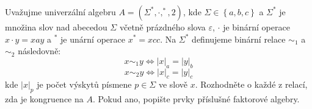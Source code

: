 \subsubsection{}
Uvažujme univerzální algebru $A=\left ( \Sigma^{*},\cdot ,^{*},2 \right )$, kde
$\Sigma \in \left \{ a,b,c \right \}$ a $\Sigma^{*}$ je množina slov nad
abecedou $\Sigma$ včetně prázdného slova $\varepsilon$, $\cdot$ je binární
operace $x \cdot y=xay$ a $^{*}$ je unární operace $x^{*}=xcc$. Na $\Sigma^{*}$
definujeme binární relace $\sim_{1}$ a $\sim_{2}$ následovně:
$$x \sim_{1} y \Leftrightarrow \left | x \right |_{a}=\left | y \right |_{b}$$
$$x \sim_{2} y \Leftrightarrow \left | x \right |_{c}=\left | y \right |_{c}$$
kde $\left | x \right |_{p}$ je počet výskytů písmene $p \in \Sigma$ ve slově
$x$. Rozhodněte o každé z relací, zda je kongruence na $A$. Pokud ano, popište
prvky příslušné faktorové algebry.
